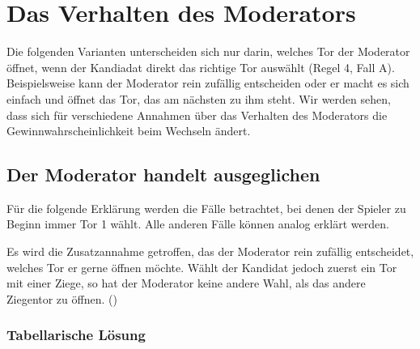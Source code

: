 \section{Das Verhalten des Moderators}

Die folgenden Varianten unterscheiden sich nur darin, welches Tor der Moderator öffnet, wenn der Kandiadat direkt das richtige Tor auswählt (Regel 4, Fall A). Beispielsweise kann der Moderator rein zufällig entscheiden oder er macht es sich einfach und öffnet das Tor, das am nächsten zu ihm steht. Wir werden sehen, dass sich für verschiedene Annahmen über das Verhalten des Moderators die Gewinnwahrscheinlichkeit beim Wechseln ändert.


\subsection{Der Moderator handelt ausgeglichen}

Für die folgende Erklärung werden die Fälle betrachtet, bei denen der Spieler zu Beginn immer Tor 1 wählt. Alle anderen Fälle können analog erklärt werden.

Es wird die Zusatzannahme getroffen, das der Moderator rein zufällig entscheidet, welches Tor er gerne öffnen möchte. Wählt der Kandidat jedoch zuerst ein Tor mit einer Ziege, so hat der Moderator keine andere Wahl, als das andere Ziegentor zu öffnen. (\cite{Krauss:2003})

\subsubsection{Tabellarische Lösung}

